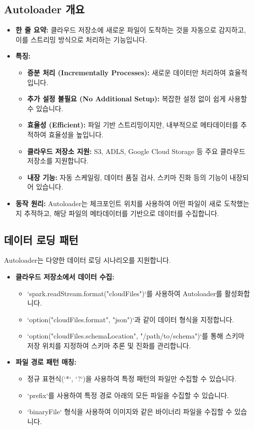 \documentclass[11pt,a4paper]{article}
\begin{document}
\subsection{Autoloader 개요}
\begin{itemize}
    \item \textbf{한 줄 요약:} 클라우드 저장소에 새로운 파일이 도착하는 것을 자동으로 감지하고, 이를 스트리밍 방식으로 처리하는 기능입니다.
    \item \textbf{특징:}
    \begin{itemize}
        \item \textbf{증분 처리 (Incrementally Processes):} 새로운 데이터만 처리하여 효율적입니다.
        \item \textbf{추가 설정 불필요 (No Additional Setup):} 복잡한 설정 없이 쉽게 사용할 수 있습니다.
        \item \textbf{효율성 (Efficient):} 파일 기반 스트리밍이지만, 내부적으로 메타데이터를 추적하여 효율성을 높입니다.
        \item \textbf{클라우드 저장소 지원:} S3, ADLS, Google Cloud Storage 등 주요 클라우드 저장소를 지원합니다.
        \item \textbf{내장 기능:} 자동 스케일링, 데이터 품질 검사, 스키마 진화 등의 기능이 내장되어 있습니다.
    \end{itemize}
    \item \textbf{동작 원리:} Autoloader는 체크포인트 위치를 사용하여 어떤 파일이 새로 도착했는지 추적하고, 해당 파일의 메타데이터를 기반으로 데이터를 수집합니다.
\end{itemize}

\subsection{데이터 로딩 패턴}
Autoloader는 다양한 데이터 로딩 시나리오를 지원합니다.

\begin{itemize}
    \item \textbf{클라우드 저장소에서 데이터 수집:}
    \begin{itemize}
        \item `spark.readStream.format("cloudFiles")`를 사용하여 Autoloader를 활성화합니다.
        \item `option("cloudFiles.format", "json")`과 같이 데이터 형식을 지정합니다.
        \item `option("cloudFiles.schemaLocation", "/path/to/schema")`를 통해 스키마 저장 위치를 지정하여 스키마 추론 및 진화를 관리합니다.
    \end{itemize}
    \item \textbf{파일 경로 패턴 매칭:}
    \begin{itemize}
        \item 정규 표현식(`*`, `?`)을 사용하여 특정 패턴의 파일만 수집할 수 있습니다.
        \item `prefix`를 사용하여 특정 경로 아래의 모든 파일을 수집할 수 있습니다.
        \item `binaryFile` 형식을 사용하여 이미지와 같은 바이너리 파일을 수집할 수 있습니다.
    \end{itemize}
\end{itemize}
\end{document}
